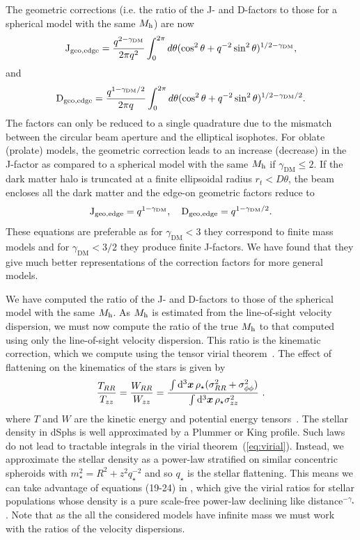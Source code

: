 \documentclass[prd,twocolumn,showpacs,preprintnumbers,superscriptaddress,nofootinbib,amsmath,amssymb,nobalancelastpage]{revtex4}
\def\Mh{M_{\rm h}}
\newcommand{\ds}{{\displaystyle}}
\newcommand{\Df}{{\rm D}}
\newcommand{\Jf}{{\rm J}}
\begin{document}
The geometric corrections (i.e. the ratio of the J- and D-factors to those for a spherical model with the same $\Mh$) are now
\begin{equation}
\Jf_{\rm geo,edge} = {q^{2-\gamma_\mathrm{DM}}\over 2 \pi q^2} \int_0^{2\pi}d\theta (\cos^2\theta +
q^{-2}\sin^2\theta)^{1/2-\gamma_\mathrm{DM}},
\label{eq:Joblatelong2}
\end{equation}
%
and
\begin{equation}
\Df_{\rm geo,edge} = {q^{1-\gamma_\mathrm{DM}/2}\over 2 \pi q} \int_0^{2\pi}d\theta (\cos^2\theta +
q^{-2}\sin^2\theta)^{1/2-\gamma_\mathrm{DM}/2}.
\end{equation}
%
The factors can only be reduced to a single quadrature due to the mismatch between the circular beam aperture and the elliptical isophotes. For oblate (prolate) models, the geometric correction leads to
an increase (decrease) in the J-factor as compared to a spherical
model with the same $\Mh$ if $\gamma_\mathrm{DM}\leq2$. If the dark matter halo is truncated at a finite ellipsoidal radius $r_t<D\theta$, the beam encloses all the dark matter and the edge-on geometric factors reduce to
\begin{equation}
 \Jf_{\rm geo,edge} = q^{1-\gamma_\mathrm{DM}},\quad\Df_{\rm geo,edge} = q^{1-\gamma_\mathrm{DM}/2}.
 \label{eq:Jedgetrunc}
 \end{equation}
These equations are preferable as for $\gamma_\mathrm{DM}<3$ they correspond to finite mass models and for $\gamma_\mathrm{DM}<3/2$ they produce finite J-factors. We have found that they give much better representations of the correction factors for more general models.


We have computed the ratio of the J- and D-factors to those of the spherical model with the same $\Mh$. As $\Mh$ is estimated from the line-of-sight velocity dispersion, we must now compute the ratio of the true $\Mh$ to that computed using only the line-of-sight velocity dispersion. This ratio is the kinematic correction, which we compute using the tensor virial
theorem~\citep[e.g.,][]{Bi78,Ag12}.  The effect of flattening on the
kinematics of the stars is given by
%
\begin{equation}
{T_{RR} \over T_{zz} }
= {W_{RR} \over W_{zz} }
=  {\ds\int\mathrm{d}^3\boldsymbol{x}\,\rho_\star(\sigma^{2}_{RR} + \sigma^2_{\phi\phi})
  \over \ds \int\mathrm{d}^3\boldsymbol{x}\,{\rho_\star
    \sigma^{2}_{zz}}}\ .
\label{eq:virial}
\end{equation}
%
where $T$ and $W$ are the kinetic energy and potential energy
tensors~\citep{Ch69,BT,Ag12}.  The stellar density in dSphs is well
approximated by a Plummer or King profile. Such laws do not lead to
tractable integrals in the virial theorem~(\ref{eq:virial}). Instead,
we approximate the stellar density as a power-law stratified on
similar concentric spheroids with $m_\star^2 = R^2 + z^2 q_\star^{-2}$
and so $q_\star$ is the stellar flattening. This means we can take
advantage of equations (19-24) in \citep{Ag12}, which give the virial
ratios for stellar populations whose density is a pure scale-free
power-law declining like distance$^{-\gamma_\star}$. Note that as the all the considered models have infinite mass we must work with the ratios of the velocity dispersions.
\end{document}
